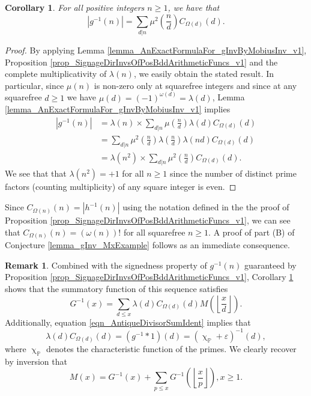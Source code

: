 \documentclass[11pt,reqno,a4letter]{article}
\numberwithin{figure}{section}
\numberwithin{table}{section}
\renewcommand{\chi}{\upchi}
\newcommand{\Floor}[2]{\ensuremath{\left\lfloor \frac{#1}{#2} \right\rfloor}}
\theoremstyle{plain}
\newtheorem{cor}[theorem]{Corollary}
\numberwithin{theorem}{section}
\theoremstyle{definition}
\newtheorem{remark}[theorem]{Remark}
\begin{document}
\begin{cor} 
\label{lemma_AbsValueOf_gInvn_FornSquareFree_v1} 
For all positive integers $n \geq 1$, we have that 
\begin{equation} 
\label{eqn_AbsValueOf_gInvn_FornSquareFree_v1} 
|g^{-1}(n)| = \sum_{d|n} \mu^2\left(\frac{n}{d}\right) C_{\Omega(d)}(d). 
\end{equation} 
\end{cor} 
\begin{proof} 
By applying 
Lemma \ref{lemma_AnExactFormulaFor_gInvByMobiusInv_v1}, 
Proposition \ref{prop_SignageDirInvsOfPosBddArithmeticFuncs_v1} and the 
complete multiplicativity of $\lambda(n)$, 
we easily obtain the stated result. 
In particular, since $\mu(n)$ is non-zero only at squarefree integers and since 
at any squarefree $d \geq 1$ we have $\mu(d) = (-1)^{\omega(d)} = \lambda(d)$, 
Lemma \ref{lemma_AnExactFormulaFor_gInvByMobiusInv_v1} implies 
\begin{align*} 
|g^{-1}(n)| & = \lambda(n) \times \sum_{d|n} \mu\left(\frac{n}{d}\right) \lambda(d) C_{\Omega(d)}(d) \\ 
     & = \sum_{d|n} \mu^2\left(\frac{n}{d}\right) \lambda\left(\frac{n}{d}\right) 
     \lambda(nd) C_{\Omega(d)}(d) \\ 
     & = \lambda(n^2) \times \sum_{d|n} \mu^2\left(\frac{n}{d}\right) C_{\Omega(d)}(d). 
\end{align*} 
We see that 
that $\lambda(n^2) = +1$ for all $n \geq 1$ since the number of distinct 
prime factors (counting multiplicity) of any square integer is even. 
\end{proof} 

Since $C_{\Omega(n)}(n) = |h^{-1}(n)|$ using the notation defined in the the proof of 
Proposition \ref{prop_SignageDirInvsOfPosBddArithmeticFuncs_v1}, we can see that 
$C_{\Omega(n)}(n) = (\omega(n))!$ for all squarefree $n \geq 1$. 
A proof of part (B) of Conjecture \ref{lemma_gInv_MxExample} 
follows as an immediate consequence. 

\begin{remark} 
Combined with the signedness property of $g^{-1}(n)$ guaranteed by 
Proposition \ref{prop_SignageDirInvsOfPosBddArithmeticFuncs_v1}, 
Corollary \ref{lemma_AbsValueOf_gInvn_FornSquareFree_v1} shows that the summatory 
function of this sequence satisfies 
\[
G^{-1}(x) = \sum_{d \leq x} \lambda(d) C_{\Omega(d)}(d) M\left(\Floor{x}{d}\right). 
\]
Additionally, equation \eqref{eqn_AntiqueDivisorSumIdent} implies that 
$$\lambda(d) C_{\Omega(d)}(d) = (g^{-1} \ast 1)(d) = (\chi_{\mathbb{P}} + \varepsilon)^{-1}(d),$$ 
where $\chi_{\mathbb{P}}$ denotes the characteristic function of the primes. We clearly 
recover by inversion that 
\[
M(x) = G^{-1}(x) + \sum_{p \leq x} G^{-1}\left(\Floor{x}{p}\right), x \geq 1. 
\]
\end{remark} 
\end{document}
